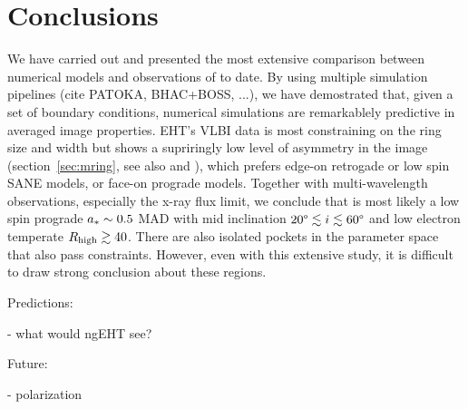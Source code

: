 \section{Conclusions}\label{sec:conclusions}


We have carried out and presented the most extensive comparison
between numerical models and observations of \sgra to date.
By using multiple simulation pipelines (cite PATOKA, BHAC+BOSS, ...),
we have demostrated that, given a set of boundary conditions,
numerical simulations are remarkablely predictive in averaged image
properties.
EHT's VLBI data is most constraining on the ring size and width but
shows a supriringly low level of asymmetry in the image
(section~\ref{sec:mring}, see also \citealt{EHTpaperIII} and
\citealt{EHTpaperIV}), which prefers edge-on retrogade or low spin
SANE models, or face-on prograde models.
Together with multi-wavelength observations, especially the x-ray flux
limit, we conclude that \sgra is most likely a low spin prograde $a_*
\sim 0.5$ MAD with mid inclination $20\degree \lesssim i \lesssim
60\degree$ and low electron temperate $R_\mathrm{high} \gtrsim 40$.
There are also isolated pockets in the parameter space that also pass
constraints.
However, even with this extensive study, it is difficult to draw
strong conclusion about these regions.

Predictions:

- what would ngEHT see?

Future:

- polarization
